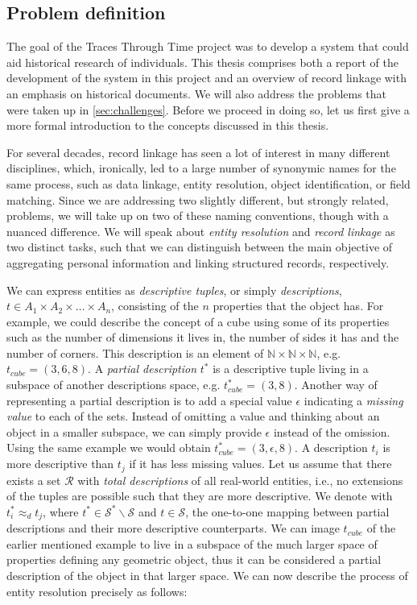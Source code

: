 

\subsection{Problem definition}
\label{sec:problem_definition}
The goal of the Traces Through Time project was to develop a system that could aid historical research of individuals.
This thesis comprises both a report of the development of the system in this project and an overview of record linkage with an emphasis on historical documents.
We will also address the problems that were taken up in \cref{sec:challenges}.
Before we proceed in doing so, let us first give a more formal introduction to the concepts discussed in this thesis.

For several decades, record linkage has seen a lot of interest in many different disciplines, which, ironically, led to a large number of synonymic names for the same process, such as data linkage, entity resolution, object identification, or field matching. \cite{christen12}
Since we are addressing two slightly different, but strongly related, problems, we will take up on two of these naming conventions, though with a nuanced difference.
We will speak about \emph{entity resolution} and \emph{record linkage} as two distinct tasks, such that we can distinguish between the main objective of aggregating personal information and linking structured records, respectively.

We can express entities as \emph{descriptive tuples}, or simply \emph{descriptions}, $t \in A_{1} \times A_{2} \times \dots \times A_{n}$, consisting of the $n$ properties that the object has.
For example, we could describe the concept of a cube using some of its properties such as the number of dimensions it lives in, the number of sides it has and the number of corners.
This description is an element of $\mathbb{N} \times \mathbb{N} \times \mathbb{N}$, e.g. $t_{cube}=(3, 6, 8)$.
A \emph{partial description} $t^{*}$ is a descriptive tuple living in a subspace of another descriptions space, e.g. $t_{cube}^{*}=(3, 8)$.
Another way of representing a partial description is to add a special value $\epsilon$ indicating a \emph{missing value} to each of the sets.
Instead of omitting a value and thinking about an object in a smaller subspace, we can simply provide $\epsilon$ instead of the omission.
Using the same example we would obtain $t_{cube}^{*}=(3, \epsilon, 8)$.
A description $t_i$ is more descriptive than $t_j$ if it has less missing values.
Let us assume that there exists a set $\mathcal{R}$ with \emph{total descriptions} of all real-world entities, i.e., no extensions of the tuples are possible such that they are more descriptive.
We denote with $t_{i}^{*} \approx_{d} t_{j}$, where $t^{*} \in \mathcal{S}^{*} \backslash \mathcal{S}$ and $t \in \mathcal{S}$, the one-to-one mapping between partial descriptions and their more descriptive counterparts.
We can image $t_{cube}$ of the earlier mentioned example to live in a subspace of the much larger space of properties defining any geometric object, thus it can be considered a partial description of the object in that larger space.
We can now describe the process of entity resolution precisely as follows:

